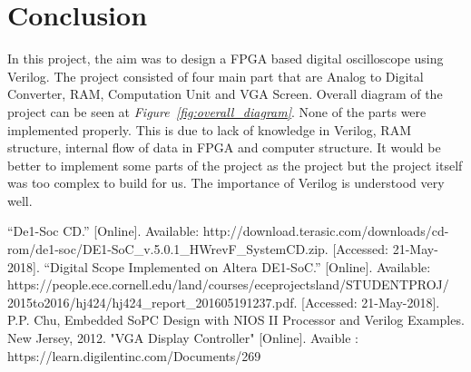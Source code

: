 \documentclass[paper]{IEEEtran}
\begin{document}
	
\section{Conclusion}
\- \indent
	In this project, the aim was to design a FPGA based digital oscilloscope using Verilog. The project consisted of four main part that are Analog to Digital Converter, RAM, Computation Unit and VGA Screen. Overall diagram of the project can be seen at \textit{Figure~\ref{fig:overall_diagram}}. None of the parts were implemented properly. This is due to lack of knowledge in Verilog, RAM structure, internal flow of data in FPGA and computer structure. It would be better to implement some parts of the project as the project but the project itself was too complex to build for us. The importance of Verilog is understood very well.
	
	

\begin{thebibliography}{00}
 “De1-Soc CD.” [Online]. Available: http://download.terasic.com/downloads/cd-rom/de1-soc/DE1-SoC\_v.5.0.1\_HWrevF\_SystemCD.zip. [Accessed: 21-May-2018].
 “Digital Scope Implemented on Altera DE1-SoC.” [Online]. Available: https://people.ece.cornell.edu/land/courses/eceprojectsland/STUDENTPROJ/\\2015to2016/hj424/hj424\_report\_201605191237.pdf. [Accessed: 21-May-2018].
 P.P. Chu, Embedded SoPC Design with NIOS II Processor and Verilog Examples. New Jersey, 2012.
 "VGA Display Controller" [Online]. Avaible : https://learn.digilentinc.com/Documents/269
\end{thebibliography}
\end{document}
